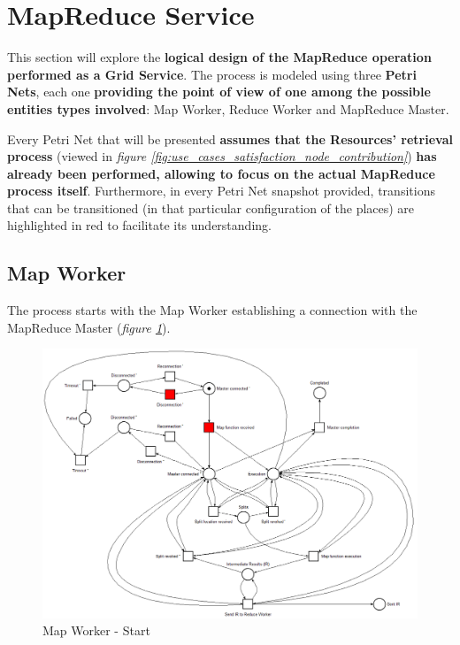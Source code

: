 \section{MapReduce Service}\label{mapreduce_service}
This section will explore the \textbf{logical design of the MapReduce operation performed as a Grid Service}. The process is modeled using three \textbf{Petri Nets}, each one \textbf{providing the point of view of one among the possible entities types involved}: Map Worker, Reduce Worker and MapReduce Master.

Every Petri Net that will be presented \textbf{assumes that the Resources' retrieval process} (viewed in \textit{figure \ref{fig:use_cases_satisfaction_node_contribution}}) \textbf{has already been performed, allowing to focus on the actual MapReduce process itself}.
Furthermore, in every Petri Net snapshot provided, transitions that can be transitioned (in that particular configuration of the places) are highlighted in red to facilitate its understanding.
  
\subsection{Map Worker}
The process starts with the Map Worker establishing a connection with the MapReduce Master (\textit{figure \ref{fig:map_worker_petri_net_1}}).

\vspace{5mm}

\begin{figure}[!ht]
    \centering
    \includegraphics[width=\linewidth]{document/chapters/chapter_6/images/map_worker_petri_net_1.png}
    \caption{Map Worker - Start}
    \label{fig:map_worker_petri_net_1}
\end{figure}

